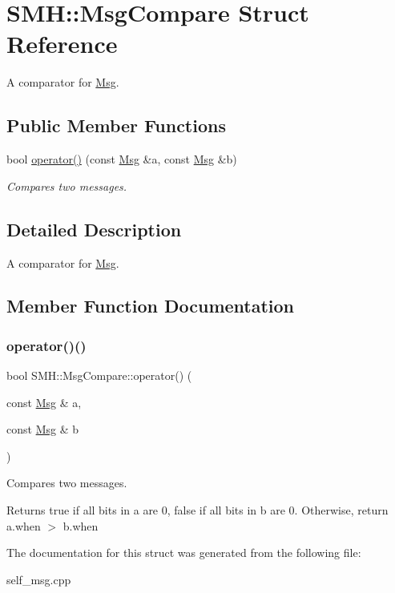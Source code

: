 \hypertarget{struct_s_m_h_1_1_msg_compare}{}\section{S\+MH\+:\+:Msg\+Compare Struct Reference}
\label{struct_s_m_h_1_1_msg_compare}


A comparator for \hyperlink{struct_s_m_h_1_1_msg}{Msg}.  


\subsection*{Public Member Functions}
\begin{DoxyCompactItemize}
\item 
bool \hyperlink{struct_s_m_h_1_1_msg_compare_afa4a56eba642be97adc3af0665588479}{operator()} (const \hyperlink{struct_s_m_h_1_1_msg}{Msg} \&a, const \hyperlink{struct_s_m_h_1_1_msg}{Msg} \&b)
\begin{DoxyCompactList}\small\item\em Compares two messages. \end{DoxyCompactList}\end{DoxyCompactItemize}


\subsection{Detailed Description}
A comparator for \hyperlink{struct_s_m_h_1_1_msg}{Msg}. 

\subsection{Member Function Documentation}
\mbox{\label{struct_s_m_h_1_1_msg_compare_afa4a56eba642be97adc3af0665588479}} 
\subsubsection{\texorpdfstring{operator()()}{operator()()}}
{\footnotesize\ttfamily bool S\+M\+H\+::\+Msg\+Compare\+::operator() (\begin{DoxyParamCaption}\item[{const \hyperlink{struct_s_m_h_1_1_msg}{Msg} \&}]{a,  }\item[{const \hyperlink{struct_s_m_h_1_1_msg}{Msg} \&}]{b }\end{DoxyParamCaption})\hspace{0.3cm}{\ttfamily [inline]}}



Compares two messages. 

Returns true if all bits in a are 0, false if all bits in b are 0. Otherwise, return a.\+when $>$ b.\+when 

The documentation for this struct was generated from the following file\+:\begin{DoxyCompactItemize}
\item 
self\+\_\+msg.\+cpp\end{DoxyCompactItemize}
